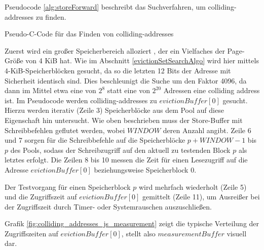 Pseudocode \ref{alg:storeForward} beschreibt das Suchverfahren, um colliding-addresses zu finden.

\begin{algorithm}[h]
\DontPrintSemicolon
\caption{Pseudo-C-Code für das Finden von colliding-addresses}
\label{alg:storeForward}

\end{algorithm}

Zuerst wird ein großer Speicherbereich alloziert %
, der ein Vielfaches der Page-Größe von 4 KiB hat.
Wie im Abschnitt \ref{evictionSetSearchAlgo} wird hier mittels 4-KiB-Speicherblöcken gesucht, da so die letzten 12 Bits der Adresse mit Sicherheit identisch sind.
Dies beschleunigt die Suche um den Faktor 4096, da dann im Mittel etwa eine von $2^8$ statt eine von $2^{20}$ Adressen eine colliding address ist.
Im Pseudocode werden colliding-addresses zu $evictionBuffer[0]$ gesucht.
Hierzu werden iterativ (Zeile 3) Speicherblöcke aus dem Pool auf diese Eigenschaft hin untersucht.
Wie oben beschrieben muss der Store-Buffer mit Schreibbefehlen geflutet werden, wobei $WINDOW$ deren Anzahl angibt.
Zeile 6 und 7 sorgen für die Schreibbefehle auf die Speicherblöcke $p + WINDOW - 1$ bis $p$ des Pools, sodass der Schreibzugriff auf den aktuell zu testenden Block $p$ als letztes erfolgt.
Die Zeilen 8 bis 10 messen die Zeit für einen Lesezugriff auf die Adresse $evictionBuffer[0]$ beziehungsweise Speicherblock 0.

Der Testvorgang für einen Speicherblock $p$ wird mehrfach wiederholt (Zeile 5) und die Zugriffszeit auf $evictionBuffer[0]$ gemittelt (Zeile 11), um Ausreißer bei der Zugriffszeit durch Timer- oder Systemrauschen auszuschließen. 

Grafik \ref{fig:colliding_addresses_js_measurement} zeigt die typische Verteilung der Zugriffszeiten auf $evictionBuffer[0]$, stellt also $measurementBuffer$ visuell dar.

